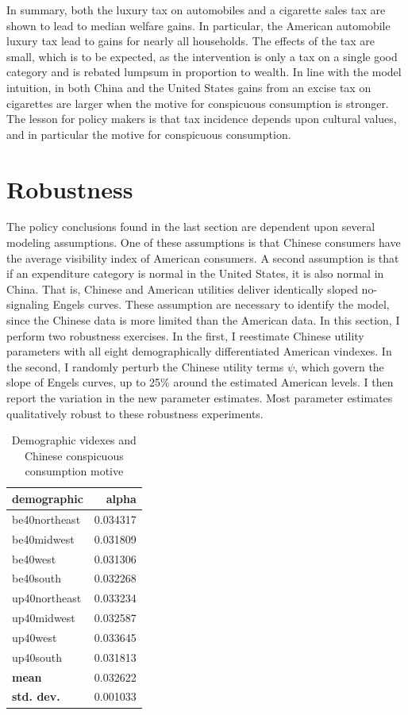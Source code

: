 \documentclass[11pt]{article}
\begin{document}
\begin{CJK}{UTF8}{gbsn}
In summary, both the luxury tax on automobiles and a cigarette sales tax are shown to lead to median welfare gains. In particular, the American automobile luxury tax lead to gains for nearly all households.  The effects of the tax are small, which is to be expected, as the intervention is only a tax on a single good category and is rebated lumpsum in proportion to wealth.  In line with the model intuition, in both China and the United States gains from an excise tax on cigarettes are larger when the motive for conspicuous consumption is stronger.  The lesson for policy makers is that tax incidence depends upon cultural values, and in particular the motive for conspicuous consumption.

\section{Robustness}
\label{sec:robustness}

The policy conclusions found in the last section are dependent upon several modeling assumptions.  One of these assumptions is that Chinese consumers have the average visibility index of American consumers.  A second assumption is that if an expenditure category is normal in the United States, it is also normal in China.  That is, Chinese and American utilities deliver identically sloped no-signaling Engels curves.  These assumption are necessary to identify the model, since the Chinese data is more limited than the American data.  In this section, I perform two robustness exercises.  In the first, I reestimate Chinese utility parameters with all eight demographically differentiated American vindexes.  In the second, I randomly perturb the Chinese utility terms $\psi$, which govern the slope of Engels curves, up to 25\% around the estimated American levels. I then report the variation in the new parameter estimates.  Most parameter estimates qualitatively robust to these robustness experiments.

\begin{table}[ht]
    \centering
\begin{tabular}{lr}
\toprule
demographic &     alpha \\
\midrule
be40northeast      & 0.034317 \\
be40midwest        & 0.031809 \\
be40west           & 0.031306 \\
be40south          & 0.032268 \\
up40northeast      & 0.033234 \\
up40midwest        & 0.032587 \\
up40west           & 0.033645 \\
up40south          & 0.031813 \\
\textbf{mean}      & 0.032622 \\
\textbf{std. dev.} & 0.001033 \\
\bottomrule
\end{tabular}
\caption{Demographic videxes and Chinese conspicuous consumption motive}
\label{tab:robust1}
\end{table}


\end{CJK}
\end{document}
